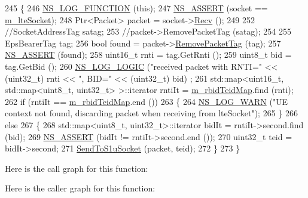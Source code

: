 \begin{DoxyCode}
245 \{
246   \hyperlink{log-macros-disabled_8h_a90b90d5bad1f39cb1b64923ea94c0761}{NS\_LOG\_FUNCTION} (\textcolor{keyword}{this});  
247   \hyperlink{assert_8h_a6dccdb0de9b252f60088ce281c49d052}{NS\_ASSERT} (socket == \hyperlink{classns3_1_1EpcEnbApplication_a510a8ee52d8499fa9e1f54b26486a80f}{m\_lteSocket});
248   Ptr<Packet> packet = socket->\hyperlink{classns3_1_1Socket_a8949b1f844aae563446f2f4c5be8827a}{Recv} ();
249 
252   \textcolor{comment}{//SocketAddressTag satag;}
253   \textcolor{comment}{//packet->RemovePacketTag (satag);}
254 
255   EpsBearerTag tag;
256   \textcolor{keywordtype}{bool} found = packet->\hyperlink{classns3_1_1Packet_a078fe922d976a417ab25ba2f3c2fd667}{RemovePacketTag} (tag);
257   \hyperlink{assert_8h_a6dccdb0de9b252f60088ce281c49d052}{NS\_ASSERT} (found);
258   uint16\_t rnti = tag.GetRnti ();
259   uint8\_t bid = tag.GetBid ();
260   \hyperlink{group__logging_ga88acd260151caf2db9c0fc84997f45ce}{NS\_LOG\_LOGIC} (\textcolor{stringliteral}{"received packet with RNTI="} << (uint32\_t) rnti << \textcolor{stringliteral}{", BID="} << (uint32\_t)  bid)
      ;
261   std::map<uint16\_t, std::map<uint8\_t, uint32\_t> >::iterator rntiIt = 
      \hyperlink{classns3_1_1EpcEnbApplication_a06ad312a7c59dd349c44bbdecf3c7358}{m\_rbidTeidMap}.find (rnti);
262   \textcolor{keywordflow}{if} (rntiIt == \hyperlink{classns3_1_1EpcEnbApplication_a06ad312a7c59dd349c44bbdecf3c7358}{m\_rbidTeidMap}.end ())
263     \{
264       \hyperlink{group__logging_gade7208b4009cdf0e25783cd26766f559}{NS\_LOG\_WARN} (\textcolor{stringliteral}{"UE context not found, discarding packet when receiving from lteSocket"});
265     \}
266   \textcolor{keywordflow}{else}
267     \{
268       std::map<uint8\_t, uint32\_t>::iterator bidIt = rntiIt->second.find (bid);
269       \hyperlink{assert_8h_a6dccdb0de9b252f60088ce281c49d052}{NS\_ASSERT} (bidIt != rntiIt->second.end ());
270       uint32\_t teid = bidIt->second;
271       \hyperlink{classns3_1_1EpcEnbApplication_a550ef90073047a928a2e31a39f91f26b}{SendToS1uSocket} (packet, teid);
272     \}
273 \}
\end{DoxyCode}


Here is the call graph for this function\+:




Here is the caller graph for this function\+:



